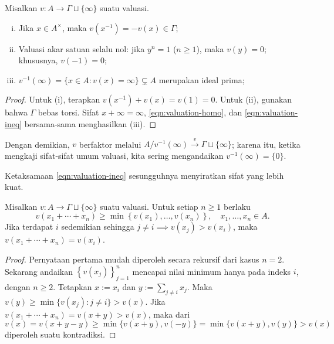\begin{lemma}\label{prop:valuation-generalities}
	Misalkan $v: A \to \Gamma \sqcup \{\infty\}$ suatu valuasi.
	\begin{enumerate}[(i)]
		\item Jika $x \in A^\times$, maka $v(x^{-1}) = -v(x) \in \Gamma$;
		\item Valuasi akar satuan selalu nol: jika $y^n = 1$ ($n \geq 1$), maka $v(y)=0$; khususnya, $v(-1)=0$;
		\item $v^{-1}(\infty) = \{x \in A: v(x) = \infty \} \subsetneq A$ merupakan ideal prima;
	\end{enumerate}
\end{lemma}
\begin{proof}
	Untuk (i), terapkan $v(x^{-1})+v(x) = v(1)=0$. Untuk (ii), gunakan bahwa $\Gamma$ bebas torsi. Sifat $x+\infty=\infty$, \eqref{eqn:valuation-homo}, dan \eqref{eqn:valuation-ineq} bersama-sama menghasilkan (iii).
\end{proof}
Dengan demikian, $v$ berfaktor melalui $A/v^{-1}(\infty) \xrightarrow{v} \Gamma \sqcup \{\infty\}$; karena itu, ketika mengkaji sifat-sifat umum valuasi, kita sering mengandaikan $v^{-1}(\infty) = \{0\}$.

Ketaksamaan \eqref{eqn:valuation-ineq} sesungguhnya menyiratkan sifat yang lebih kuat.
\begin{lemma}\label{prop:ultrametric}
	Misalkan $v: A \to \Gamma \sqcup \{\infty\}$ suatu valuasi. Untuk setiap $n \geq 1$ berlaku
	\[ v(x_1 + \cdots + x_n) \geq \min\left\{ v(x_1), \ldots, v(x_n)  \right\}, \quad x_1, \ldots, x_n \in A. \]
	Jika terdapat $i$ sedemikian sehingga $j \neq i \implies v(x_j) > v(x_i)$, maka $v(x_1 + \cdots + x_n) = v(x_i)$.
\end{lemma}
\begin{proof}
	Pernyataan pertama mudah diperoleh secara rekursif dari kasus $n=2$. Sekarang andaikan $\left\{v(x_j)\right\}_{j=1}^n$ mencapai nilai minimum hanya pada indeks $i$, dengan $n \geq 2$. Tetapkan $x := x_i$ dan $y := \sum_{j \neq i} x_j$. Maka $v(y) \geq \min\{ v(x_j) : j \neq i \} > v(x)$. Jika $v(x_1 + \cdots + x_n) = v(x+y) > v(x)$, maka dari
	\[ v(x) = v(x+y-y) \geq \min\{v(x+y), v(-y) \} = \min\{ v(x+y), v(y) \} > v(x) \]
	diperoleh suatu kontradiksi.
\end{proof}

